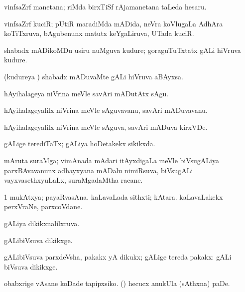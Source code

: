 \noindent
\gl{\pagu}
\bmng
{} vinfsaZrf manetana;  riMda birxTiSf rAjamanetana taLeda hesaru. 
\emng
\eentry

\bentry
{}
\gl{\nA}
\bmng
vinfsaZrf kuciR; pUtiR maradiMda mADida, neVra koVlugaLa AdhAra koTiTxruva, bAgubenunx matutx keYgaLiruva, UTada kuciR. 
\emng
\eentry

\bentry
{}
\gl{\nA}
\bmng
shabadx mADikoMDu usiru nuMguva kudure; goraguTuTxtatx gALi hiVruva kudure. 
\emng
\eentry

\bentry
{}
\gl{\nA}
\bmng
(kudureya \vi) shabadx mADuvaMte gALi hiVruva aBAyxsa. 
\emng
\eentry

\bentry
{}
\gl{\akirx}
\bmng
hAyihalageya niVrina meVle savAri mADutAtx sAgu. 
\emng
\eentry

\bentry
{}
\gl{\nA}
\bmng
hAyihalageyalilx niVrina meVle sAguvavanu, savAri mADuvavanu. 
\emng
\eentry

\bentry
{}
\gl{\nA}
\bmng
hAyihalageyalilx niVrina meVle sAguva, savAri mADuva kirxVDe. 
\emng
\eentry

\bentry
{}
\gl{\gu}
\bmng
gALige terediTaTx; gALiya hoDetakekx sikikxda. 
\emng
\eentry

\bentry
{}
\gl{\nA}
\bmng
mAruta suraMga; vimAnada mAdari itAyxdigaLa meVle biVsugALiya parxBAvavanunx adhayxyana mADalu nimiRsuva, biVsugALi vayxvasethxyuLaLx, suraMgadaMtha racane. 
\emng
\eentry

\bentry
{}
\gl{\nA}
\bmng
\bnum
\num{1} mukAtxya; payaRvasAna. 
\banum
{} kaLavaLada sithxti; kAtara. 
 kaLavaLakekx perxVraNe, parxcoVdane. 
\eanum
\numie
\enum
\emng
\eentry

\bentry
{} 
\gl{\gu}
\expl{}
\bmng
gALiya dikikxnalilxruva. 
\emng
\eentry

\bentry
{}
\gl{\kirxvi}
\bmng
gALibiVsuva dikikxge. 
\emng
\eentry

\bentry
{}
\gl{\nA}
\bmng
gALibiVsuva parxdeVsha, pakakx yA dikukx; gALige tereda pakakx:  gALi biVsuva dikikxge. 
\emng

\noindent
\gl{\pagu}
\expl{}
\bmng
{} 
\banum
{} obabxrige vAsane koDade tapipxsiko. 
 (\rUpa) hecucx anukUla (sAthxna) paDe. 
\eanum
\emng
\eentry

